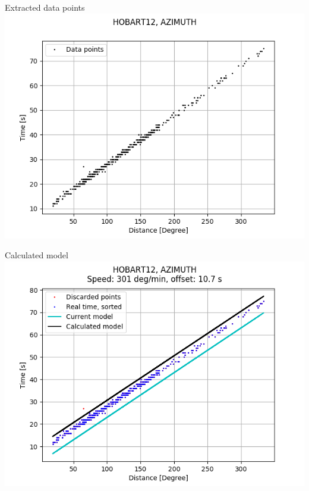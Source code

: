\documentclass{beamer}
\begin{document}
    \begin{frame}{Extracted data points}
        \centering
        \includegraphics[width=1\columnwidth]{HOBART12_AZIMUT_DATA}
    \end{frame}
    \begin{frame}{Calculated model}
        \centering
        \includegraphics[width=1\columnwidth]{HOBART12_AZIMUT}
    \end{frame}
\end{document}
